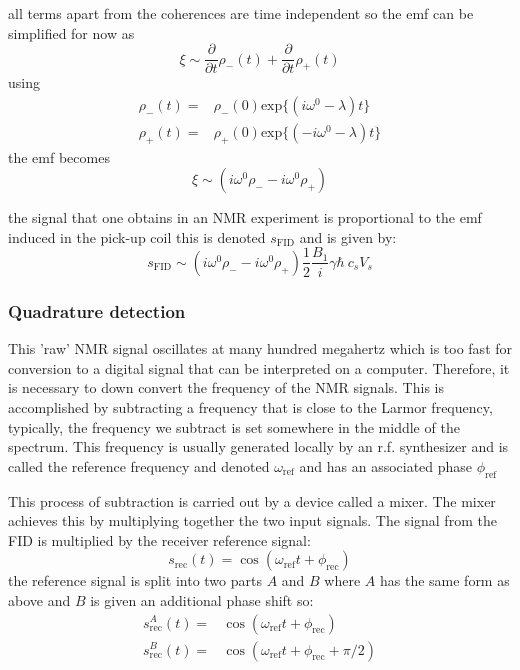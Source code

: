 all terms apart from the coherences are time independent so the emf can be simplified for now as
\begin{equation}
  \xi \sim \frac{\partial}{\partial{t}}\rho_-(t) + \frac{\partial}{\partial{t}}\rho_+(t)
\end{equation}
using 
\begin{align}
  \rho_-(t) =& \rho_-(0)\text{exp}\{(i\omega^0-\lambda)t\}\\
  \rho_+(t) =& \rho_+(0)\text{exp}\{(-i\omega^0-\lambda)t\}
\end{align}
the emf becomes
\begin{equation}
  \xi \sim (i\omega^0\rho_- - i\omega^0\rho_+)
\end{equation}

the signal that one obtains in an NMR experiment is proportional to the emf induced in the pick-up coil this
is denoted $s_\text{FID}$ and is given by:
\begin{equation}
  s_\text{FID} \sim (i\omega^0\rho_- - i\omega^0\rho_+)\frac{1}{2}\frac{B_1}{i}\gamma\hbar~c_sV_s
\end{equation}

\subsubsection{Quadrature detection}

This 'raw' NMR signal oscillates at many hundred megahertz which is too fast for
conversion to a digital signal that can be interpreted on a computer. Therefore,
it is necessary to down convert the frequency of the NMR signals. This is accomplished
by subtracting a frequency that is close to the Larmor frequency, typically, the frequency
we subtract is set somewhere in the middle of the spectrum. This frequency is usually generated locally
by an r.f. synthesizer and is called the reference frequency and denoted $\omega_\text{ref}$ and has an associated
phase $\phi_\text{ref}$

This process of subtraction is carried out by a device called a mixer. The mixer
achieves this by multiplying together the two input signals. The signal from the FID is
multiplied by the receiver reference signal:
\begin{equation}
  s_{\text{rec}}(t) = \cos(\omega_{\text{ref}}t + \phi_{\text{rec}})
\end{equation}
the reference signal is split into two parts $A$ and $B$ where $A$ has the same form as above and $B$ is
given an additional phase shift so:
\begin{align}
  s_{\text{rec}}^A(t) =& \cos(\omega_{\text{ref}}t + \phi_{\text{rec}})\\
  s_{\text{rec}}^B(t) =& \cos(\omega_{\text{ref}}t + \phi_{\text{rec}} + \pi/2)
\end{align}

